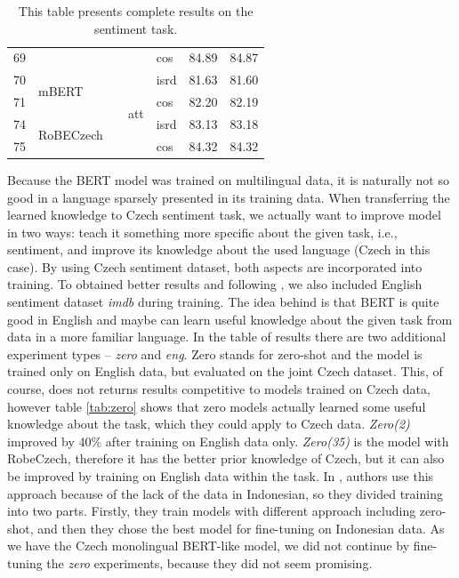 \begin{table}[]
{\begin{tabular}{|l|l|l|l|l||ll|}
69 &                            &                           &    & cos                   & 84.89   & 84.87 \\ \cline{1-2} \cline{4-7}
70 & \multirow{2}{*}{mBERT}     &                           & \multirow{4}{*}{att}   & isrd                  & 81.63   & 81.60 \\ \cline{1-1}\cline{5-7}
71 &                            &                           &   & cos                   & 82.20   & 82.19 \\ \cline{1-2} \cline{5-7}
74 & \multirow{2}{*}{RoBECzech} &                           &   & isrd                  & 83.13   & 83.18 \\ \cline{1-1} \cline{5-7}
75 &                            &                           &   & cos                   & 84.32   & 84.32 \\ \hline
\end{tabular}}
\caption{This table presents complete results on the sentiment task. }
\label{tab:res_all_sent}
\end{table}

\par
Because the BERT model was trained on multilingual data, it is naturally not so good in a language sparsely presented in its training data. When transferring the learned knowledge to Czech sentiment task, we actually want to improve model in two ways: teach it something more specific about the given task, i.e., sentiment, and improve its knowledge about the used language (Czech in this case). By using Czech sentiment dataset, both aspects are incorporated into training. To obtained better results and following \citet{putra}, we also included English sentiment dataset \textit{imdb} during training. The idea behind is that BERT is quite good in English and maybe can learn useful knowledge about the given task from data in a more familiar language. In the table of results there are two additional experiment types -- \textit{zero} and \textit{eng}. Zero stands for zero-shot and the model is trained only on English data, but evaluated on the joint Czech dataset. This, of course, does not returns results competitive to models trained on Czech data, however table \ref{tab:zero} shows that zero models actually learned some useful knowledge about the task, which they could apply to Czech data. \textit{Zero(2)} improved by 40\% after training on English data only. \textit{Zero(35)} is the model with RobeCzech, therefore it has the better prior knowledge of Czech, but it can also be improved by training on English data within the task. In \citet{putra}, authors use this approach because of the lack of the data in Indonesian, so they divided training into two parts. Firstly, they train models with different approach including zero-shot, and then they chose the best model for fine-tuning on Indonesian data. As we have the Czech monolingual BERT-like model, we did not continue by fine-tuning the \textit{zero} experiments, because they did not seem promising.

